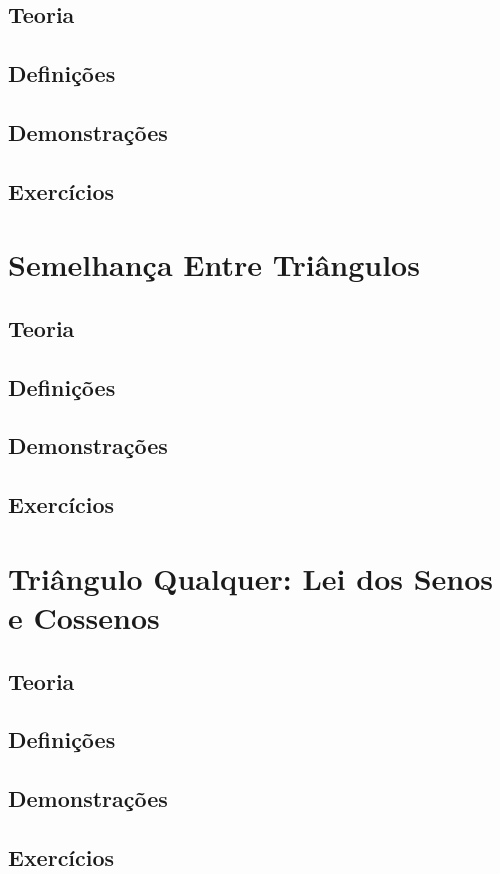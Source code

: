 \documentclass[portuguese, 12pt, a4paper]{article}
\begin{document}
	\subsection{Teoria}
	\subsection{Definições}
	\subsection{Demonstrações}
	\subsection{Exercícios}
	
	\section{Semelhança Entre Triângulos}
	\subsection{Teoria}
	\subsection{Definições}
	\subsection{Demonstrações}
	\subsection{Exercícios}
	
	\section{Triângulo Qualquer: Lei dos Senos e Cossenos}
	\subsection{Teoria}
	\subsection{Definições}
	\subsection{Demonstrações}
	\subsection{Exercícios}
	
\end{document}

